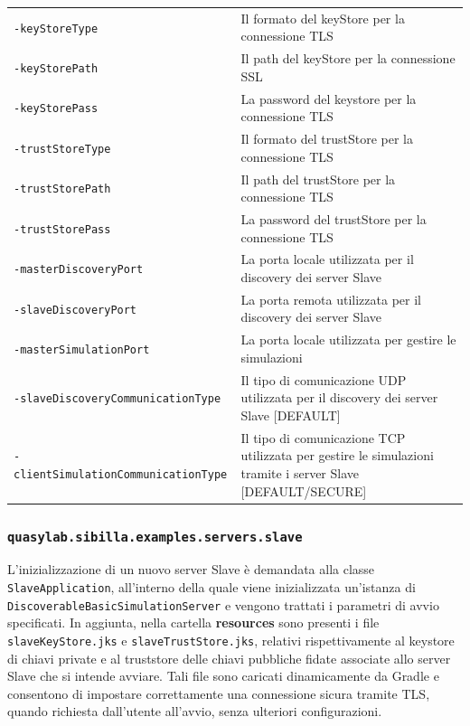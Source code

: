 \begin{table}[H]
    \begin{tabularx}{\linewidth}{ l X }
        \texttt{-keyStoreType}         & Il formato del keyStore per la connessione TLS              \\
        \texttt{-keyStorePath}         & Il path del keyStore per la connessione SSL                  \\
        \texttt{-keyStorePass}         & La password del keystore per la connessione TLS               \\
        \texttt{-trustStoreType}       & Il formato del trustStore per la connessione TLS            \\
        \texttt{-trustStorePath}       & Il path del trustStore per la connessione TLS                \\
        \texttt{-trustStorePass}       & La password del trustStore per la connessione TLS            \\
        \texttt{-masterDiscoveryPort}  & La porta locale utilizzata per il discovery dei server Slave \\
        \texttt{-slaveDiscoveryPort}   & La porta remota utilizzata per il discovery dei server Slave \\
        \texttt{-masterSimulationPort} & La porta locale utilizzata per gestire le simulazioni        \\
        \texttt{-slaveDiscoveryCommunicationType}   & Il tipo di comunicazione UDP utilizzata per il discovery dei server Slave {[}DEFAULT{]}     \\
        \texttt{-clientSimulationCommunicationType} & Il tipo di comunicazione TCP utilizzata per gestire le simulazioni tramite i server Slave {[}DEFAULT/SECURE{]}
    \end{tabularx}
\end{table}

\subsubsection{\texttt{quasylab.sibilla.examples.servers.slave}}

L'inizializzazione di un nuovo server Slave è demandata alla classe \texttt{SlaveApplication}, all'interno della quale viene inizializzata un'istanza di \texttt{DiscoverableBasicSimulationServer} e vengono trattati i parametri di avvio specificati.
In aggiunta, nella cartella \textbf{resources} sono presenti i file \texttt{slaveKeyStore.jks} e \texttt{slaveTrustStore.jks}, relativi rispettivamente al keystore di chiavi private e al truststore delle chiavi pubbliche fidate associate allo server Slave che si intende avviare. Tali file sono caricati dinamicamente da Gradle e consentono di impostare correttamente una connessione sicura tramite TLS, quando richiesta dall'utente all'avvio, senza ulteriori configurazioni.


